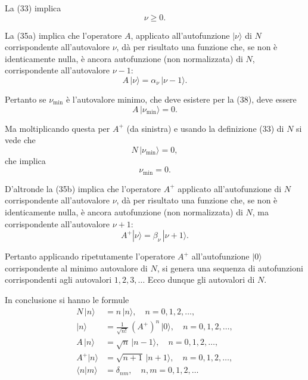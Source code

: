 \documentclass[11pt, a4paper]{book}
\numberwithin{equation}{section}
\begin{document}

La (33) implica
\begin{equation}
\nu \geq 0.
\end{equation}

La (35a) implica che l'operatore $A$, applicato all'autofunzione $|\nu\rangle$
di $N$ corrispondente all'autovalore $\nu$, dà per risultato una funzione
che, se non è identicamente nulla, è ancora autofunzione (non normalizzata)
di $N$, corrispondente all'autovalore $\nu-1$:
\begin{equation}
A\,|\nu\rangle = \alpha_\nu\,|\nu-1\rangle.
\end{equation}

Pertanto se $\nu_{\min}$ è l'autovalore minimo, che deve esistere per la
(38), deve essere
\begin{equation}
A\,|\nu_{\min}\rangle = 0.
\end{equation}

Ma moltiplicando questa per $A^+$ (da sinistra) e usando la definizione
(33) di $N$ si vede che
\begin{equation}
N\,|\nu_{\min}\rangle = 0,
\end{equation}
che implica
\begin{equation}
\nu_{\min} = 0.
\end{equation}

D'altronde la (35b) implica che l'operatore $A^+$ applicato
all'autofunzione di $N$ corrispondente all'autovalore $\nu$, dà per
risultato una funzione che, se non è identicamente nulla, è ancora
autofunzione (non normalizzata) di $N$, ma corrispondente all'autovalore
$\nu+1$:
\begin{equation}
A^+|\nu\rangle = \beta_\nu\,|\nu+1\rangle.
\end{equation}

Pertanto applicando ripetutamente l'operatore $A^+$ all'autofunzione
$|0\rangle$ corrispondente al minimo autovalore di $N$, si genera una
sequenza di autofunzioni corrispondenti agli autovalori $1, 2, 3, \ldots$
Ecco dunque gli autovalori di $N$.

In conclusione si hanno le formule
\begin{align}
N\,|n\rangle &= n\,|n\rangle, \quad n = 0, 1, 2, \ldots, \tag{44} \\
|n\rangle &= \frac{1}{\sqrt{n!}}\,(A^+)^n\,|0\rangle, \quad n=0,1,2,\ldots, \tag{45} \\
A\,|n\rangle  &= \sqrt{n}\,|n-1\rangle, \quad n=0,1,2,\ldots, \tag{46a} \\
A^+|n\rangle  &= \sqrt{n+1}\,|n+1\rangle, \quad n=0,1,2,\ldots, \tag{46b} \\
\langle n|m\rangle &= \delta_{nm}, \quad n,m = 0,1,2,\ldots \tag{47}
\end{align}
\end{document}
